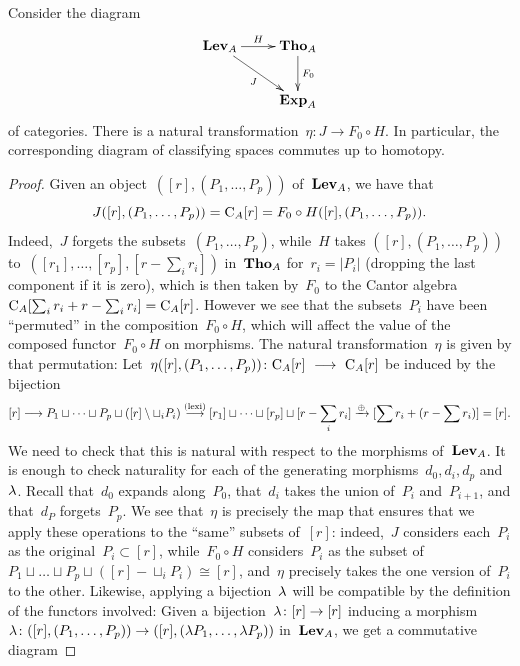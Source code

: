 \begin{prop}
Consider the diagram 
$$\xymatrix{\Lev_A \ar[dr]_{J} \ar[r]^-H & \Tho_A \ar[d]^{F_0}\\
& \Exp_A}$$
of categories. There is a natural transformation~$\eta\colon J \to F_0\circ H$. In particular, the corresponding diagram of classifying spaces commutes up to homotopy. 
\end{prop}

\begin{proof}
Given an object~$([r],(P_1,\dots,P_p))$ of~$\mathbf{Lev}_A$, we have that
$$J([r],(P_1,\dots,P_p))=\mathrm{C}_A[r]=F_0\circ H([r],(P_1,\dots,P_p)).$$ Indeed,~$J$ forgets the subsets~$(P_1,\dots,P_p)$, while~$H$ takes 
$([r],(P_1,\dots,P_p))$ to~$([r_1],\dots,[r_p],[r-\sum_i r_i])$ in~$\mathbf{Tho}_A$ for~$r_i=|P_i|$ (dropping the last component if it is zero), which is then taken by~$F_0$ to the Cantor algebra~\hbox{$\mathrm{C}_A[\sum_i r_i+r-\sum_i r_i]=\mathrm{C}_A[r]$}. However we see that the subsets~$P_i$ have been ``permuted'' in the composition~$F_0\circ H$, which will affect the value of the composed functor~$F_0\circ H$ on morphisms. The natural transformation~$\eta$ is given by that permutation: 
Let~$\eta([r],(P_1,\dots,P_p))\colon\rmC_A[r] \ \rar\ \rmC_A[r]$ be induced by the bijection  
$$[r]\longrightarrow P_1\sqcup\dots\sqcup P_p\sqcup\left([r]\setminus\sqcup_iP_i\right) \stackrel{(\textrm{lexi})}{\longrightarrow} [r_1]\sqcup\dots\sqcup [r_p]\sqcup [r-\sum_i r_i]\xrightarrow{\oplus} [\sum r_i + (r-\sum r_i)]=[r].$$
We need to check that this is natural with respect to the morphisms of~$\mathbf{Lev}_A$. It is enough to check naturality for each of the generating morphisms~$d_0,d_i,d_p$ and~$\lambda$.
Recall that~$d_0$ expands along~$P_0$, that~$d_i$ takes the union of~$P_i$ and~$P_{i+1}$, and that~$d_P$ forgets~$P_p$. We see that~$\eta$ is precisely the map that ensures that we apply these operations to the ``same'' subsets of~$[r]$: indeed,~$J$ considers each~$P_i$ as the original~$P_i\subset [r]$, while~$F_0\circ H$ considers~$P_i$ as the subset of~\hbox{$P_1\sqcup\dots\sqcup P_p\sqcup ([r]\minus \sqcup_iP_i)\cong [r]$}, and~$\eta$ precisely takes the one version of~$P_i$ to the other. 
Likewise, applying a bijection~$\lambda$ will be compatible by the definition of the functors involved: 
Given a bijection~$\lambda\colon[r]\to [r]$ inducing a morphism~\hbox{$\lambda\colon([r],(P_1,\dots,P_p))\to ([r],(\lambda P_1,\dots,\lambda P_p))$} in~$\mathbf{Lev}_A$, we get a commutative diagram 

\end{proof}
